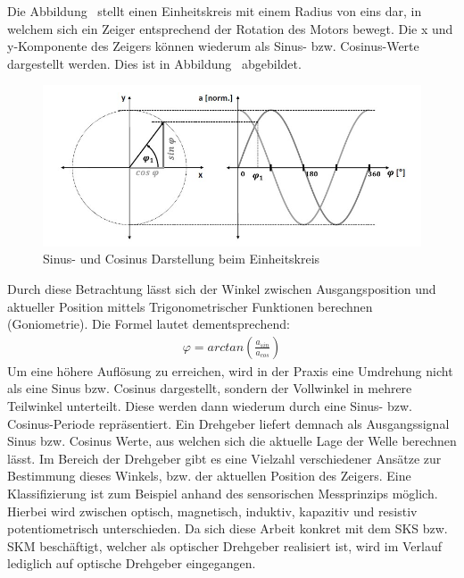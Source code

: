 Die Abbildung \dq {}\dq~stellt einen Einheitskreis mit einem Radius von eins dar, in welchem sich ein Zeiger entsprechend der Rotation des Motors bewegt. Die x und y-Komponente des Zeigers können wiederum als Sinus- bzw. Cosinus-Werte dargestellt werden. Dies ist in Abbildung \dq {}\dq~abgebildet.
  \begin{figure}[h]
        \centering
        \includegraphics[width=1\textwidth]{img/einheitskreis_sin_cos.jpg} 
        \caption[Sinus- und Cosinus Darstellung beim Einheitskreis]{Sinus- und Cosinus Darstellung beim Einheitskreis \cite{Basler.2016}}
        \label{fig:einheitskreis_sin_cos.jpg}
    \end{figure}
 Durch diese Betrachtung lässt sich der Winkel zwischen Ausgangsposition und aktueller Position mittels Trigonometrischer Funktionen berechnen (Goniometrie). Die Formel lautet dementsprechend:\cite{Basler.2016}
        \begin{align*}
             \varphi = arctan \left( \frac{a_{sin}}{a_{cos}} \right)
			\label{Test}        
        \end{align*}
Um eine höhere Auflösung zu erreichen, wird in der Praxis eine Umdrehung nicht als eine Sinus bzw. Cosinus dargestellt, sondern der Vollwinkel in mehrere Teilwinkel unterteilt. Diese werden dann wiederum durch eine Sinus- bzw. Cosinus-Periode repräsentiert. 
Ein Drehgeber liefert demnach als Ausgangssignal Sinus bzw. Cosinus Werte, aus welchen sich die aktuelle Lage der Welle berechnen lässt.
Im Bereich der Drehgeber gibt es eine Vielzahl verschiedener Ansätze zur Bestimmung dieses Winkels, bzw. der aktuellen Position des Zeigers.
Eine Klassifizierung ist zum Beispiel anhand des sensorischen Messprinzips möglich. Hierbei wird zwischen optisch, magnetisch, induktiv, kapazitiv und resistiv potentiometrisch unterschieden.
Da sich diese Arbeit konkret mit dem SKS bzw. SKM beschäftigt, welcher als optischer Drehgeber realisiert ist, wird im Verlauf lediglich auf optische Drehgeber eingegangen.

